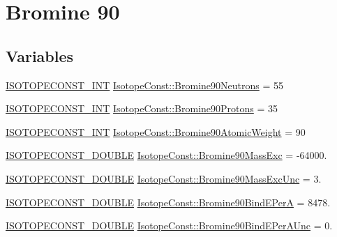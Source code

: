 \hypertarget{group___isotope_const-_bromine-_br90}{}\section{Bromine 90}
\label{group___isotope_const-_bromine-_br90}
\subsection*{Variables}
\begin{DoxyCompactItemize}
\item 
\mbox{\hyperlink{group___isotope_const-_macros_ga5f18360b3e99483a35c32d789e62621c}{I\+S\+O\+T\+O\+P\+E\+C\+O\+N\+S\+T\+\_\+\+I\+NT}} \mbox{\hyperlink{group___isotope_const-_bromine-_br90_ga5fc43f81eb37d56aa52497d9c36a88bb}{Isotope\+Const\+::\+Bromine90\+Neutrons}} = 55
\item 
\mbox{\hyperlink{group___isotope_const-_macros_ga5f18360b3e99483a35c32d789e62621c}{I\+S\+O\+T\+O\+P\+E\+C\+O\+N\+S\+T\+\_\+\+I\+NT}} \mbox{\hyperlink{group___isotope_const-_bromine-_br90_ga3cf28fcfebdd74fe5abf4676480f4b25}{Isotope\+Const\+::\+Bromine90\+Protons}} = 35
\item 
\mbox{\hyperlink{group___isotope_const-_macros_ga5f18360b3e99483a35c32d789e62621c}{I\+S\+O\+T\+O\+P\+E\+C\+O\+N\+S\+T\+\_\+\+I\+NT}} \mbox{\hyperlink{group___isotope_const-_bromine-_br90_ga901261d7adb51c978168aac247a44a97}{Isotope\+Const\+::\+Bromine90\+Atomic\+Weight}} = 90
\item 
\mbox{\hyperlink{group___isotope_const-_macros_ga8f45a7272ce02c0b4c65c44636ed719a}{I\+S\+O\+T\+O\+P\+E\+C\+O\+N\+S\+T\+\_\+\+D\+O\+U\+B\+LE}} \mbox{\hyperlink{group___isotope_const-_bromine-_br90_ga74c00951bfdd933816b6e762f0747e6f}{Isotope\+Const\+::\+Bromine90\+Mass\+Exc}} = -\/64000.
\item 
\mbox{\hyperlink{group___isotope_const-_macros_ga8f45a7272ce02c0b4c65c44636ed719a}{I\+S\+O\+T\+O\+P\+E\+C\+O\+N\+S\+T\+\_\+\+D\+O\+U\+B\+LE}} \mbox{\hyperlink{group___isotope_const-_bromine-_br90_gac920df207657bfe062298bd902cf3654}{Isotope\+Const\+::\+Bromine90\+Mass\+Exc\+Unc}} = 3.
\item 
\mbox{\hyperlink{group___isotope_const-_macros_ga8f45a7272ce02c0b4c65c44636ed719a}{I\+S\+O\+T\+O\+P\+E\+C\+O\+N\+S\+T\+\_\+\+D\+O\+U\+B\+LE}} \mbox{\hyperlink{group___isotope_const-_bromine-_br90_ga71c5fc618fdc5ea18e615f1462820177}{Isotope\+Const\+::\+Bromine90\+Bind\+E\+PerA}} = 8478.
\item 
\mbox{\hyperlink{group___isotope_const-_macros_ga8f45a7272ce02c0b4c65c44636ed719a}{I\+S\+O\+T\+O\+P\+E\+C\+O\+N\+S\+T\+\_\+\+D\+O\+U\+B\+LE}} \mbox{\hyperlink{group___isotope_const-_bromine-_br90_gad6ada0c821d45e0ac82979b0f2861451}{Isotope\+Const\+::\+Bromine90\+Bind\+E\+Per\+A\+Unc}} = 0.

\end{DoxyCompactItemize}
